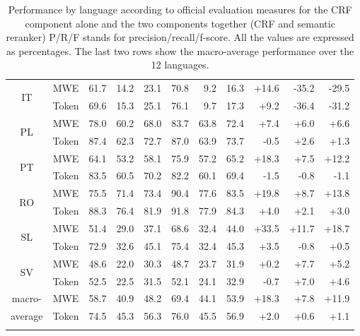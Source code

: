 \documentclass[output=paper,modfonts,nonflat]{langsci/langscibook}
\begin{document}
\begin{table}[p]
{\begin{tabular}{ccrrrrrrrrr}
    \multirow{2}{*}{IT}&   MWE & 61.7 & 14.2 & 23.1 &      70.8  &      9.2  &     16.3 &    +14.6 &   -35.2 &   -29.5\\
    & Token & 69.6 & 15.3 & 25.1 &      76.1  &      9.7  &     17.3 &     +9.2 &   -36.4 &   -31.2\\
    \multirow{2}{*}{PL}&   MWE&  78.0 & 60.2 & 68.0 &      83.7  &     63.8  &     72.4 &     +7.4 &     +6.0 &     +6.6\\
    & Token&  87.4 & 62.3 & 72.7 &      87.0  &     63.9  &     73.7 &    -0.5 &     +2.6 &     +1.3\\
    \multirow{2}{*}{PT}&   MWE&  64.1 & 53.2 & 58.1 &      75.9  &     57.2  &     65.2 &    +18.3 &     +7.5 &    +12.2\\
    & Token&  83.5 & 60.5 & 70.2 &      82.2  &     60.1  &     69.4 &    -1.5 &    -0.8 &    -1.1\\
    \multirow{2}{*}{RO}&   MWE&  75.5 & 71.4 & 73.4 &      90.4  &     77.6  &     83.5 &    +19.8  &    +8.7 &    +13.8\\
    & Token&  88.3 & 76.4 & 81.9 &      91.8  &     77.9  &     84.3 &     +4.0 &     +2.1 &     +3.0\\
    \multirow{2}{*}{SL}&   MWE&  51.4 & 29.0 & 37.1 &      68.6  &     32.4  &     44.0 &    +33.5 &    +11.7 &    +18.7\\
    & Token&  72.9 & 32.6 & 45.1 &      75.4  &     32.4  &     45.3 &     +3.5 &    -0.8 &     +0.5\\
    \multirow{2}{*}{SV}&   MWE&  48.6 & 22.0 & 30.3 &      48.7  &     23.7  &     31.9 &     +0.2 &     +7.7 &     +5.2\\
    & Token&  52.5 & 22.5 & 31.5 &      52.1  &     24.1  &     32.9 &    -0.7 &     +7.0 &     +4.6\\
  \midrule
 {\scriptsize macro-}&   MWE&  58.7 & 40.9 & 48.2 &      69.4  &     44.1  &     53.9 &    +18.3 &     +7.8 &    +11.9\\
{\scriptsize average} & Token&  74.5 & 45.3 & 56.3 &      76.0  &     45.5  &     56.9 &     +2.0 &     +0.6 &     +1.1\\
\lspbottomrule
  \end{tabular} 
  }
\caption{Performance by language according to official evaluation
    measures for the CRF component alone and the two components
    together (CRF and semantic reranker) P/R/F stands for precision/recall/f-score. All the
  values are expressed as percentages. The last two rows show the
  macro-average performance over the 12
  languages.\label{tab:perfByLang}}
\end{table} 
\end{document}
